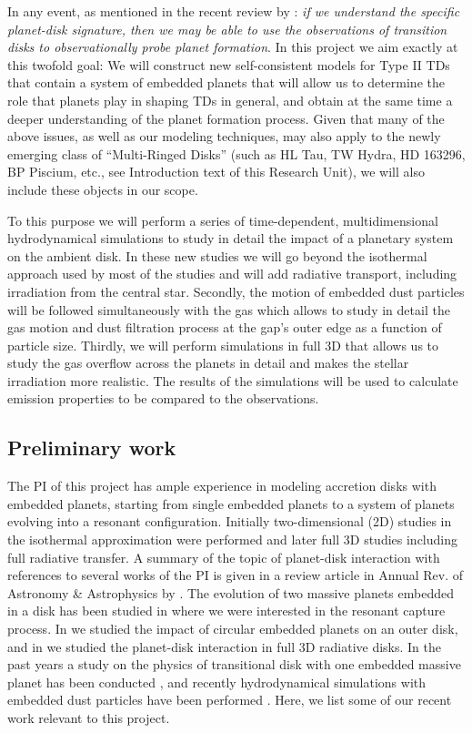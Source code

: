 \documentclass[10pt,fleqn,twoside]{article}
\begin{document}
In any event, as mentioned in the recent review by \citep{2016PASA...33....5O}: 
{\it if we understand the specific planet-disk signature, then we may be able to
use the observations of transition disks to observationally probe planet formation}.
In this project we aim exactly at this twofold goal: We will construct new self-consistent models 
for Type II TDs that contain a system of embedded planets that will allow us to determine
the role that planets play in shaping TDs in general, and obtain at the same time a deeper understanding of the planet
formation process.
 Given that many of the above issues, as well as our modeling techniques, 
may also apply to the newly emerging class of ``Multi-Ringed Disks'' (such as HL Tau,
TW Hydra, HD 163296, BP Piscium, etc., see Introduction text of this Research
Unit), we will also include these objects in our scope.

To this purpose we will perform a series of time-dependent, multidimensional hydrodynamical 
simulations to study in detail the impact of a planetary system on the ambient disk. 
In these new studies we will go beyond the isothermal approach used
by most of the studies and will add radiative transport, including irradiation from the central star.
Secondly, the motion of embedded dust particles will be followed simultaneously with the gas
which allows to study in detail the gas motion and dust filtration process at the gap's outer edge as a function
of particle size. Thirdly, we will perform simulations in full 3D that allows us to study the gas overflow
across the planets in detail and makes the stellar irradiation more realistic. 
The results of the simulations will be used to calculate emission properties to be compared to the observations.

\subsection{Preliminary work}
The PI of this project has ample experience in modeling accretion disks with embedded planets, starting from single
embedded planets to a system of planets evolving into a resonant configuration. Initially two-dimensional (2D) studies
in the isothermal approximation were performed and later full 3D studies including full radiative transfer. 
A summary of the topic of planet-disk interaction with references to several works of the PI is given in a review
article in Annual Rev. of Astronomy \& Astrophysics by \citet{2012ARA&A..50..211K}.
The evolution of two massive planets embedded in a disk has been studied in \citet{2004A&A...414..735K} where
we were interested in the resonant capture process. In \citet{2006A&A...447..369K} we
studied the impact of circular embedded planets on an outer disk, and in
\citet{2009A&A...506..971K} we studied the planet-disk interaction in full 3D radiative disks. 
In the past years a study on the physics of transitional disk 
with one embedded massive planet has been conducted \citet{2013A&A...560A..40M},
and recently hydrodynamical simulations with embedded dust particles have 
been performed \citet{2015A&A...584A.110P,2016A&A...594A..57S}. 
Here, we list some of our recent work relevant to this project.
\end{document}
